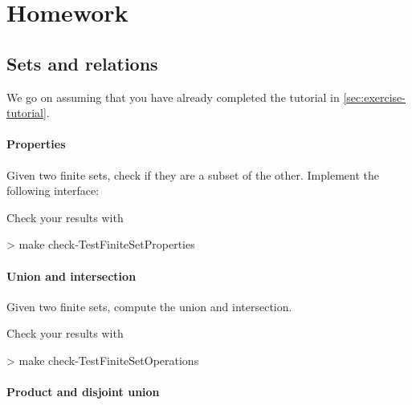 \part{Homework}



\chapter{Sets and relations}

We go on assuming that you have already completed the tutorial in \cref{sec:exercise-tutorial}.

\subsection{Properties}

\begin{gradedexercise}
Given two finite sets, check if they are a subset of the other.
Implement the following interface:
\end{gradedexercise}

Check your results with
\begin{console}
> make check-TestFiniteSetProperties
\end{console}

\subsection{Union and intersection}


\begin{gradedexercise}
Given two finite sets, compute the union and intersection.
\end{gradedexercise}


Check your results with
\begin{console}
> make check-TestFiniteSetOperations
\end{console}




\subsection{Product and disjoint union}

